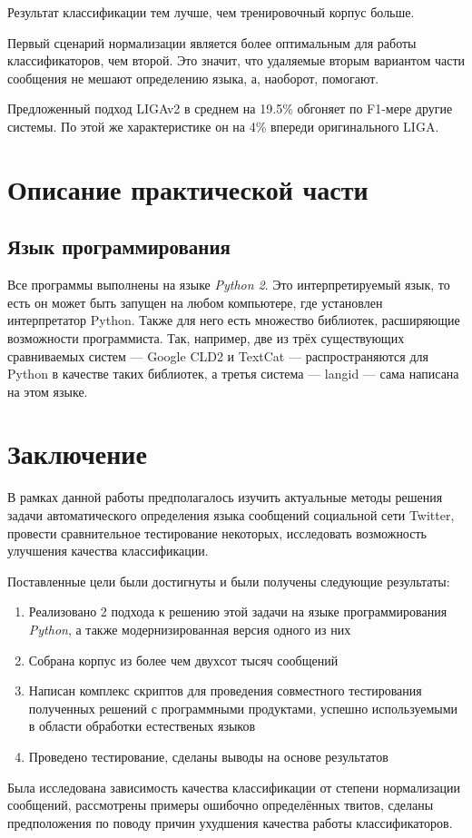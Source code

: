 \documentclass[a4paper, 14pt]{article}
\begin{document}
		Результат классификации тем лучше, чем тренировочный корпус больше.
		
		Первый сценарий нормализации является более оптимальным для работы классификаторов, чем второй. Это значит, что удаляемые вторым вариантом части сообщения не мешают определению языка, а, наоборот, помогают.
		
		Предложенный подход LIGAv2 в среднем на 19.5\% обгоняет по F1-мере другие системы. По этой же характеристике он на 4\% впереди оригинального LIGA.
		
		
		

\section{Описание практической части}
		\subsection{Язык программирования}
		Все программы выполнены на языке \textit{Python 2}. Это интерпретируемый язык, то есть он может быть запущен на любом компьютере, где установлен интерпретатор Python. Также для него есть множество библиотек, расширяющие возможности программиста. Так, например, две из трёх существующих сравниваемых систем --- Google CLD2 и TextCat --- распространяются для Python в качестве таких библиотек, а третья система --- langid --- сама написана на этом языке.

\pagebreak
	
\section{Заключение}
		В рамках данной работы предполагалось изучить актуальные методы решения задачи автоматического определения языка сообщений социальной сети Twitter, провести сравнительное тестирование некоторых, исследовать возможность улучшения качества классификации. 
		
		Поставленные цели были достигнуты и были получены следующие результаты:
		\begin{enumerate}
			\item Реализовано 2 подхода к решению этой задачи на языке программирования \textit{Python}, а также модернизированная версия одного из них
			\item Собрана корпус из более чем двухсот тысяч сообщений
			\item Написан комплекс скриптов для проведения совместного тестирования полученных решений с программными продуктами, успешно используемыми в области обработки естественых языков
			\item Проведено тестирование, сделаны выводы на основе результатов
		\end{enumerate}
		Была исследована зависимость качества классификации от степени нормализации сообщений, 
		рассмотрены примеры ошибочно определённых твитов, сделаны предположения по поводу причин ухудшения качества работы классификаторов.
		
\end{document}
